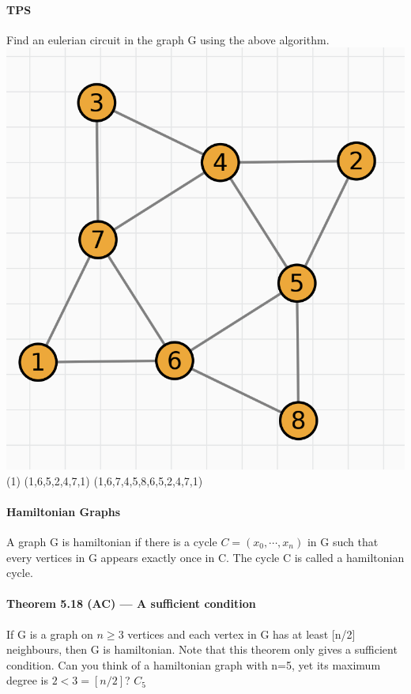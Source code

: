 \documentclass{article}
\begin{document}
\paragraph{TPS}
Find an eulerian circuit in the graph G using the above algorithm.\newline
\includegraphics{0068}\newline
(1)\newline
(1,6,5,2,4,7,1)\newline
(1,6,7,4,5,8,6,5,2,4,7,1)
\paragraph{Hamiltonian Graphs}
A graph G is hamiltonian if there is a cycle $C=(x_0,\cdots, x_n)$ in G such that every vertices in G appears exactly once in C.\newline
The cycle C is called a hamiltonian cycle.
\paragraph{Theorem 5.18 (AC) — A sufficient condition} If G is a graph on $n\ge 3$ vertices and each vertex in G has at
least [n/2] neighbours, then G is hamiltonian.\newline
Note that this theorem only gives a sufficient condition.\newline
Can you think of a hamiltonian graph with n=5, yet its maximum degree is $2<3=[n/2]$?\newline
$C_5$
\end{document}
